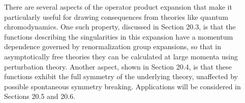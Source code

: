 There are several aspects of the operator product expansion that make it
particularly useful for drawing consequences from theories like quantum
chromodynamics. One such property, discussed in Section 20.3, is that the
functions describing the singularities in this expansion have a momentum
dependence governed by renormalization group expansions, so that in
asymptotically free theories they can be calculated at large momenta using
perturbation theory. Another aspect, shown in Section 20.4, is that these
functions exhibit the full symmetry of the underlying theory, unaffected by
possible spontaneous symmetry breaking. Applications will be considered in
Sections 20.5 and 20.6.
